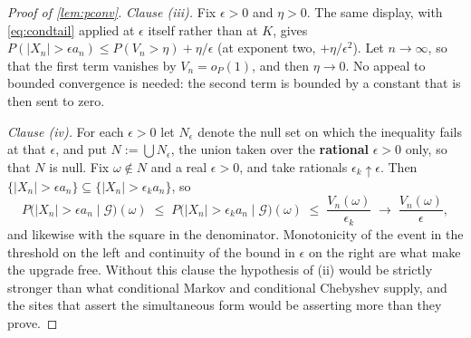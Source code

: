 \begin{proof}[Proof of \cref{lem:pconv}]
\emph{Clause (iii).} Fix $\epsilon>0$ and $\eta>0$. The same display, with \eqref{eq:condtail} applied at
$\epsilon$ itself rather than at $K$, gives
$P(|X_n|>\epsilon a_n)\le P(V_n>\eta)+\eta/\epsilon$ (at exponent two, $+\eta/\epsilon^{2}$). Let
$n\to\infty$, so that the first term vanishes by $V_n=o_P(1)$, and then $\eta\to0$. No appeal to
bounded convergence is needed: the second term is bounded by a constant that is then sent to zero.

\emph{Clause (iv).} For each $\epsilon>0$ let $N_\epsilon$ denote the null set on which the inequality
fails at that $\epsilon$, and put $N:=\bigcup N_\epsilon$, the union taken over the \textbf{rational}
$\epsilon>0$ only, so that $N$ is null. Fix $\omega\notin N$ and a real $\epsilon>0$, and take rationals
$\epsilon_k\uparrow\epsilon$. Then $\{|X_n|>\epsilon a_n\}\subseteq\{|X_n|>\epsilon_ka_n\}$, so
\[
P\big(|X_n|>\epsilon a_n\mid\mathcal G\big)(\omega)
\;\le\;P\big(|X_n|>\epsilon_k a_n\mid\mathcal G\big)(\omega)
\;\le\;\frac{V_n(\omega)}{\epsilon_k}\;\longrightarrow\;\frac{V_n(\omega)}{\epsilon},
\]
and likewise with the square in the denominator. Monotonicity of the event in the threshold on the
left and continuity of the bound in $\epsilon$ on the right are what make the upgrade free. Without this
clause the hypothesis of (ii) would be strictly stronger than what conditional Markov and conditional
Chebyshev supply, and the sites that assert the simultaneous form would be asserting more than they prove.
\end{proof}

